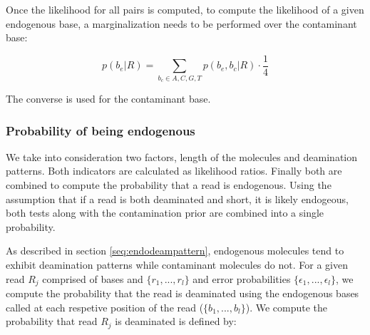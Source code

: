 \documentclass[a4paper,12pt]{article}
\begin{document}
\noindent Once the likelihood for all pairs is computed, to compute the likelihood of a given endogenous base, a marginalization needs to be performed over the contaminant base: 

\begin{equation}
  p(b_e|R)   = \sum_{b_c \in {A,C,G,T}} p(b_e,b_c|R) \cdot \frac {1} {4} 
\end{equation} 

\noindent The converse is used for the contaminant base. 




















\subsubsection{Probability of being endogenous}
\label{sec:priorendo}

We take into consideration two factors, length of the molecules and deamination patterns. Both indicators are calculated as likelihood ratios. Finally both are combined to compute the probability that a read is endogenous. Using the assumption that if a read is both deaminated and short, it is likely endogeous, both tests along with the contamination prior are combined into a single probability. 


As described in section \ref{seq:endodeampattern}, endogenous molecules tend to exhibit deamination patterns while contaminant molecules do not. For a given read $R_j$ comprised of bases and $\{ r_1, ..., r_l \}$ and error probabilities $\{ \epsilon_1, ..., \epsilon_l \}$, we compute the probability that the read is deaminated using the endogenous bases called at each respetive position of the read ($\{ b_1, ..., b_l \}$). We compute the probability that read $R_j$ is deaminated is defined by:
\end{document}
